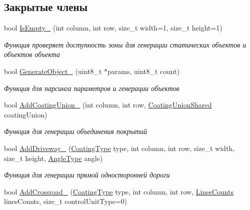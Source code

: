 \subsection*{Закрытые члены}
\begin{DoxyCompactItemize}
\item 
bool \hyperlink{classrtm_1_1_world_controller_adb901be7a42ea77c48eadc1358f89af1}{Is\+Empty\+\_\+} (int column, int row, size\+\_\+t width=1, size\+\_\+t height=1)
\begin{DoxyCompactList}\small\item\em Функция проверяет доступность зоны для генерации статических объектов и объектов объекта \end{DoxyCompactList}\item 
bool \hyperlink{classrtm_1_1_world_controller_a23b126a4227462eb8c6637f105c23614}{Generate\+Object\+\_\+} (uint8\+\_\+t $\ast$params, uint8\+\_\+t count)
\begin{DoxyCompactList}\small\item\em Функция для парсинга параметров и генерации объектов \end{DoxyCompactList}\item 
bool \hyperlink{classrtm_1_1_world_controller_a6639efb9bada52ca44f485482e7b0e70}{Add\+Coating\+Union\+\_\+} (int column, int row, \hyperlink{namespacertm_a0b1daa4ff7c2591d8433d441f9e56e4c}{Coating\+Union\+Shared} coating\+Union)
\begin{DoxyCompactList}\small\item\em Функция для генерации объединения покрытий \end{DoxyCompactList}\item 
bool \hyperlink{classrtm_1_1_world_controller_ae1ed62925357166038cde39adab53171}{Add\+Driveway\+\_\+} (\hyperlink{namespacertm_aecd3929e64cd461eb3555b611f6fad95}{Coating\+Type} type, int column, int row, size\+\_\+t width, size\+\_\+t height, \hyperlink{namespacertm_a69dc82b16a0148c10962caa83d930f89}{Angle\+Type} angle)
\begin{DoxyCompactList}\small\item\em Функция для генерации прямой односторонней дороги \end{DoxyCompactList}\item 
bool \hyperlink{classrtm_1_1_world_controller_a044376120aaed246dcb1e15b7ca345ac}{Add\+Crossroad\+\_\+} (\hyperlink{namespacertm_aecd3929e64cd461eb3555b611f6fad95}{Coating\+Type} type, int column, int row, \hyperlink{namespacertm_a14457f3088a92b86a96686b72d3e4eea}{Lines\+Counts} lines\+Counts, size\+\_\+t control\+Unit\+Type=0)

\end{DoxyCompactItemize}
